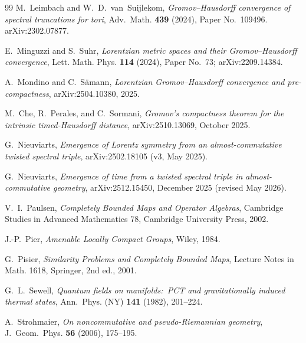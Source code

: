 \documentclass[11pt,a4paper]{article}
\theoremstyle{plain}
\theoremstyle{definition}
\begin{document}
\begin{thebibliography}{99}
M.~Leimbach and W.~D.~van~Suijlekom,
\newblock \emph{Gromov--Hausdorff convergence of spectral truncations
for tori},
\newblock Adv.~Math. \textbf{439} (2024), Paper No.~109496. arXiv:2302.07877.

E.~Minguzzi and S.~Suhr,
\newblock \emph{Lorentzian metric spaces and their Gromov--Hausdorff
convergence},
\newblock Lett. Math. Phys. \textbf{114} (2024), Paper No.~73;
\newblock arXiv:2209.14384.

A.~Mondino and C.~Sämann,
\newblock \emph{Lorentzian Gromov--Hausdorff convergence
and pre-compactness},
\newblock arXiv:2504.10380, 2025.

M.~Che, R.~Perales, and C.~Sormani,
\newblock \emph{Gromov's compactness theorem for the intrinsic
timed-Hausdorff distance},
\newblock arXiv:2510.13069, October 2025.

G.~Nieuviarts,
\newblock \emph{Emergence of Lorentz symmetry from an almost-commutative
twisted spectral triple},
\newblock arXiv:2502.18105 (v3, May 2025).

G.~Nieuviarts,
\newblock \emph{Emergence of time from a twisted spectral triple in
almost-commutative geometry},
\newblock arXiv:2512.15450, December 2025 (revised May 2026).

V.~I.~Paulsen,
\newblock \emph{Completely Bounded Maps and Operator Algebras},
\newblock Cambridge Studies in Advanced Mathematics 78,
Cambridge University Press, 2002.

J.-P.~Pier,
\newblock \emph{Amenable Locally Compact Groups},
\newblock Wiley, 1984.

G.~Pisier,
\newblock \emph{Similarity Problems and Completely Bounded Maps},
\newblock Lecture Notes in Math. 1618, Springer, 2nd ed., 2001.

G.~L.~Sewell,
\newblock \emph{Quantum fields on manifolds:\ PCT and gravitationally
induced thermal states},
\newblock Ann.~Phys. (NY) \textbf{141} (1982), 201--224.

A.~Strohmaier,
\newblock \emph{On noncommutative and pseudo-Riemannian geometry},
\newblock J.~Geom.~Phys. \textbf{56} (2006), 175--195.


\end{thebibliography}
\end{document}
